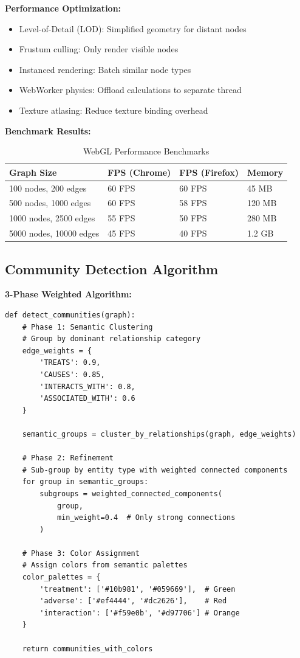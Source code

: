 \textbf{Performance Optimization:}
\begin{itemize}
    \item Level-of-Detail (LOD): Simplified geometry for distant nodes
    \item Frustum culling: Only render visible nodes
    \item Instanced rendering: Batch similar node types
    \item WebWorker physics: Offload calculations to separate thread
    \item Texture atlasing: Reduce texture binding overhead
\end{itemize}

\textbf{Benchmark Results:}
\begin{table}[h]
\centering
\caption{WebGL Performance Benchmarks}
\begin{tabularx}{\textwidth}{lXXX}
\toprule
\textbf{Graph Size} & \textbf{FPS (Chrome)} & \textbf{FPS (Firefox)} & \textbf{Memory} \\
\midrule
100 nodes, 200 edges & 60 FPS & 60 FPS & 45 MB \\
500 nodes, 1000 edges & 60 FPS & 58 FPS & 120 MB \\
1000 nodes, 2500 edges & 55 FPS & 50 FPS & 280 MB \\
5000 nodes, 10000 edges & 45 FPS & 40 FPS & 1.2 GB \\
\bottomrule
\end{tabularx}
\end{table}

\subsection{Community Detection Algorithm}

\textbf{3-Phase Weighted Algorithm:}

\begin{lstlisting}[style=pythonstyle]
def detect_communities(graph):
    # Phase 1: Semantic Clustering
    # Group by dominant relationship category
    edge_weights = {
        'TREATS': 0.9,
        'CAUSES': 0.85,
        'INTERACTS_WITH': 0.8,
        'ASSOCIATED_WITH': 0.6
    }
    
    semantic_groups = cluster_by_relationships(graph, edge_weights)
    
    # Phase 2: Refinement
    # Sub-group by entity type with weighted connected components
    for group in semantic_groups:
        subgroups = weighted_connected_components(
            group,
            min_weight=0.4  # Only strong connections
        )
    
    # Phase 3: Color Assignment
    # Assign colors from semantic palettes
    color_palettes = {
        'treatment': ['#10b981', '#059669'],  # Green
        'adverse': ['#ef4444', '#dc2626'],    # Red
        'interaction': ['#f59e0b', '#d97706'] # Orange
    }
    
    return communities_with_colors
\end{lstlisting}

